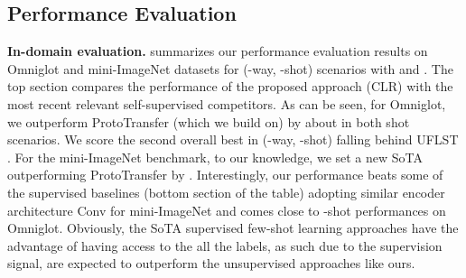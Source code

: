 \documentclass{article}
\begin{document}
\begin{table}[th!]
{\begin{tabularx}{\linewidth}{@{}>{\arraybackslash}l *2{@{}>{\centering\arraybackslash}X} | *2{>{\centering\arraybackslash}X} | *2{>{\centering\arraybackslash}X} | *2{>{\centering\arraybackslash}X}}
				\bottomrule
			\end{tabularx}}
	\label{tab:cdfsl_full}
\end{table}


\subsection{Performance Evaluation}\label{ssec:perf-eval}


\textbf{In-domain evaluation.}  summarizes our performance evaluation results on Omniglot and mini-ImageNet datasets for (-way, -shot) scenarios with  and . The top section compares the performance of the proposed approach (CLR) with the most recent relevant self-supervised competitors. As can be seen, for Omniglot, we outperform ProtoTransfer \citep{Medina2020Self-SupervisedClassification} (which we build on) by about  in both  shot scenarios. We score the second overall best in (-way, -shot) falling behind UFLST \citep{Ji2019UnsupervisedTraining}. For the mini-ImageNet benchmark, to our knowledge, we set a new SoTA outperforming ProtoTransfer by . Interestingly, our performance beats some of the supervised baselines (bottom section of the table) adopting similar encoder architecture Conv for mini-ImageNet and comes close to -shot performances on Omniglot. Obviously, the SoTA supervised few-shot learning approaches have the advantage of having access to the all the labels, as such due to the supervision signal, are expected to outperform the unsupervised approaches like ours.    
\end{document}

